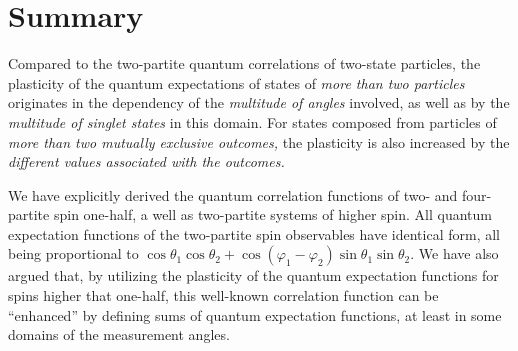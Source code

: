 \documentclass[pra,amsfonts,showpacs,showkeys,preprint]{revtex4}
\begin{document}
\section{Summary}

Compared to the two-partite quantum correlations of two-state particles,
the plasticity of the quantum expectations of states of {\em more than  two particles }
originates in the dependency of the {\em multitude of angles} involved, as well as by the {\em multitude of singlet states} in this domain.
For states composed from particles of {\em more than two mutually exclusive outcomes,} the plasticity
is also increased by the {\em different values associated with the outcomes.}

We have explicitly derived the quantum correlation functions of two- and four-partite spin one-half, a well as two-partite systems of higher spin.
All quantum expectation functions of the two-partite spin observables have identical form, all being proportional to
$\cos \theta_1 \cos \theta_2 + \cos (\varphi_1 - \varphi_2) \sin \theta_1 \sin \theta_2$.
We have also argued that, by utilizing the plasticity of the quantum expectation functions for spins higher that one-half,
this well-known correlation function can be ``enhanced'' by defining sums of quantum expectation functions,
at least in some domains of the measurement angles.
\end{document}
